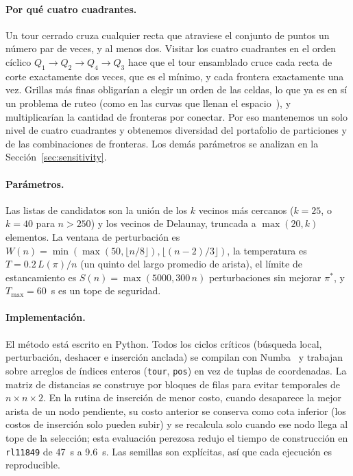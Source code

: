 \documentclass[runningheads]{llncs}
\begin{document}
\paragraph{Por qué cuatro cuadrantes.} Un tour cerrado cruza cualquier
recta que atraviese el conjunto de puntos un número par de veces, y al
menos dos. Visitar los cuatro cuadrantes en el orden cíclico
$Q_1\!\to\!Q_2\!\to\!Q_4\!\to\!Q_3$ hace que el tour ensamblado cruce
cada recta de corte exactamente dos veces, que es el mínimo, y cada
frontera exactamente una vez. Grillas más finas obligarían a elegir un
orden de las celdas, lo que ya es en sí un problema de ruteo (como en
las curvas que llenan el espacio~\cite{bartholdi1982spacefilling}), y
multiplicarían la cantidad de fronteras por conectar. Por eso
mantenemos un solo nivel de cuatro cuadrantes y obtenemos diversidad del
portafolio de particiones y de las combinaciones de fronteras. Los demás
parámetros se analizan en la Sección~\ref{sec:sensitivity}.

\paragraph{Parámetros.}
Las listas de candidatos son la unión de los $k$ vecinos más cercanos
($k=25$, o $k=40$ para $n>250$) y los vecinos de Delaunay, truncada a
$\max(20,k)$ elementos. La ventana de perturbación es
$W(n)=\min(\max(50,\lfloor n/8\rfloor),\lfloor(n-2)/3\rfloor)$, la
temperatura es $T=0.2\,L(\pi)/n$ (un quinto del largo promedio de
arista), el límite de estancamiento es $S(n)=\max(5000,300\,n)$
perturbaciones sin mejorar $\pi^*$, y $T_{\max}=60$~s es un tope de
seguridad.

\paragraph{Implementación.}
El método está escrito en Python. Todos los ciclos críticos (búsqueda
local, perturbación, deshacer e inserción anclada) se compilan con
Numba~\cite{lam2015numba} y trabajan sobre arreglos de índices enteros
(\texttt{tour}, \texttt{pos}) en vez de tuplas de coordenadas. La matriz
de distancias se construye por bloques de filas para evitar temporales de
$n\times n\times 2$. En la rutina de inserción de menor costo, cuando
desaparece la mejor arista de un nodo pendiente, su costo anterior se
conserva como cota inferior (los costos de inserción solo pueden subir) y
se recalcula solo cuando ese nodo llega al tope de la selección; esta
evaluación perezosa redujo el tiempo de construcción en
\texttt{rl11849} de 47~s a 9.6~s. Las semillas son explícitas, así que
cada ejecución es reproducible.
\end{document}

